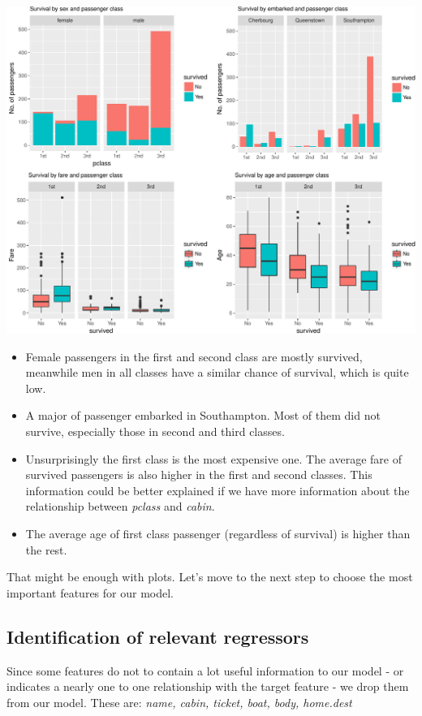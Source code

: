 \documentclass[12,]{article}
\providecommand{\tightlist}{%
  \setlength{\itemsep}{0pt}\setlength{\parskip}{0pt}}
\begin{document}
\includegraphics{Seminararbeit_1_Gruppe_2_files/figure-latex/unnamed-chunk-11-1.pdf}

\begin{itemize}
\tightlist
\item
  Female passengers in the first and second class are mostly survived,
  meanwhile men in all classes have a similar chance of survival, which
  is quite low.
\item
  A major of passenger embarked in Southampton. Most of them did not
  survive, especially those in second and third classes.
\item
  Unsurprisingly the first class is the most expensive one. The average
  fare of survived passengers is also higher in the first and second
  classes. This information could be better explained if we have more
  information about the relationship between \emph{pclass} and
  \emph{cabin}.
\item
  The average age of first class passenger (regardless of survival) is
  higher than the rest.
\end{itemize}

That might be enough with plots. Let's move to the next step to choose
the most important features for our model.

\subsection{Identification of relevant
regressors}\label{identification-of-relevant-regressors}

Since some features do not to contain a lot useful information to our
model - or indicates a nearly one to one relationship with the target
feature - we drop them from our model. These are: \emph{name, cabin,
ticket, boat, body, home.dest}
\end{document}
